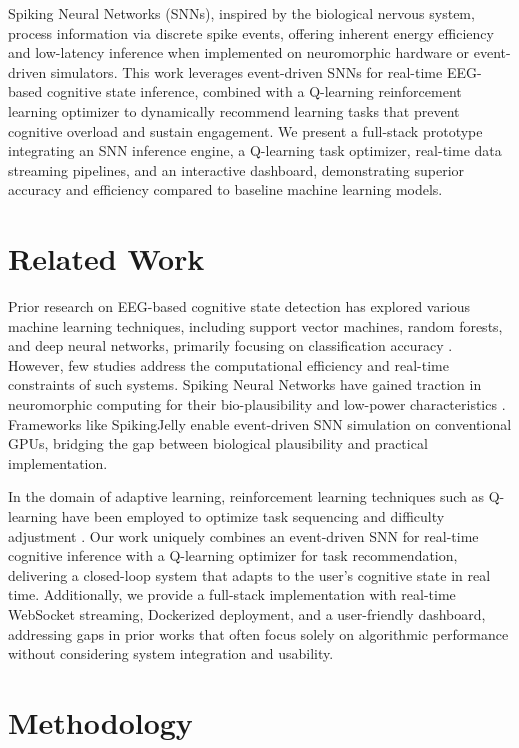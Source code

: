 \documentclass[conference]{IEEEtran}
\begin{document}
Spiking Neural Networks (SNNs), inspired by the biological nervous system, process information via discrete spike events, offering inherent energy efficiency and low-latency inference when implemented on neuromorphic hardware or event-driven simulators. This work leverages event-driven SNNs for real-time EEG-based cognitive state inference, combined with a Q-learning reinforcement learning optimizer to dynamically recommend learning tasks that prevent cognitive overload and sustain engagement. We present a full-stack prototype integrating an SNN inference engine, a Q-learning task optimizer, real-time data streaming pipelines, and an interactive dashboard, demonstrating superior accuracy and efficiency compared to baseline machine learning models.

\section{Related Work}
\label{related-work}
Prior research on EEG-based cognitive state detection has explored various machine learning techniques, including support vector machines, random forests, and deep neural networks, primarily focusing on classification accuracy \cite{deap2012}. However, few studies address the computational efficiency and real-time constraints of such systems. Spiking Neural Networks have gained traction in neuromorphic computing for their bio-plausibility and low-power characteristics \cite{davies2018loihi}. Frameworks like SpikingJelly \cite{fang2020spikingjelly} enable event-driven SNN simulation on conventional GPUs, bridging the gap between biological plausibility and practical implementation.

In the domain of adaptive learning, reinforcement learning techniques such as Q-learning have been employed to optimize task sequencing and difficulty adjustment \cite{wojcik2022adaptive}. Our work uniquely combines an event-driven SNN for real-time cognitive inference with a Q-learning optimizer for task recommendation, delivering a closed-loop system that adapts to the user's cognitive state in real time. Additionally, we provide a full-stack implementation with real-time WebSocket streaming, Dockerized deployment, and a user-friendly dashboard, addressing gaps in prior works that often focus solely on algorithmic performance without considering system integration and usability.

\section{Methodology}
\label{methodology}
\end{document}
